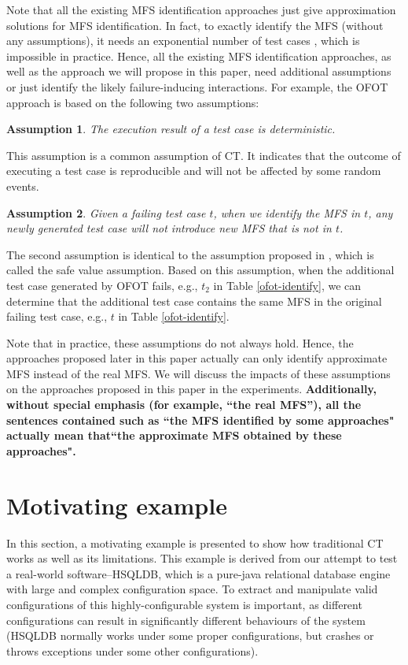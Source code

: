 \documentclass[journal,12pt,onecolumn,draftclsnofoot,]{IEEEtran}
\begin{document}
Note that all the existing MFS identification approaches just give approximation solutions for MFS identification. In fact, to exactly identify the MFS (without any assumptions), it needs an exponential number of test cases \cite{niu2013identifying}, which is impossible in practice. Hence, all the existing MFS identification approaches, as well as the approach we will propose in this paper, need additional assumptions or just identify the likely failure-inducing interactions. For example, the OFOT approach is based on the following two assumptions:
\newtheorem{assumption}{Assumption}
\begin{assumption}  The execution result of a test case is deterministic.
\end{assumption}

This assumption is a common assumption of CT\cite{zhang2011characterizing,ghandehari2012identifying,niu2013identifying}. It indicates that the outcome of executing a test case is reproducible and will not be affected by some random events.

\begin{assumption}
Given a failing test case $t$, when we identify the MFS in $t$, any newly generated test case will not introduce new MFS that is not in $t$.
\end{assumption}

The second assumption is identical to the assumption proposed in \cite{zhang2011characterizing,martinez2008algorithms,martinez2009locating}, which is called the safe value assumption. Based on this assumption, when the additional test case generated by OFOT fails, e.g., $t_{2}$ in Table \ref{ofot-identify}, we can determine that the additional test case contains the same MFS in the original failing test case, e.g., $t$ in Table \ref{ofot-identify}.

Note that in practice, these assumptions do not always hold. Hence, the approaches proposed later in this paper actually can only identify approximate MFS instead of the real MFS. We will discuss the impacts of these assumptions on the approaches proposed in this paper in the experiments. \textbf{Additionally, without special emphasis (for example, ``the real MFS''), all the sentences contained such as ``the MFS identified by some approaches" actually mean that``the approximate MFS obtained by these approaches".}

\section{Motivating example}\label{sec:moti}
In this section, a motivating example is presented to show how traditional CT works as well as its limitations. This example is derived from our attempt to test a real-world software--HSQLDB, which is a pure-java relational database engine with large and complex configuration space. To extract and manipulate valid configurations of this highly-configurable system is important, as different configurations can result in significantly different behaviours of the system \cite{jin2014configurations,qu2008configuration,song2012itree} (HSQLDB normally works under some proper configurations, but crashes or throws exceptions under some other configurations).
\end{document}
